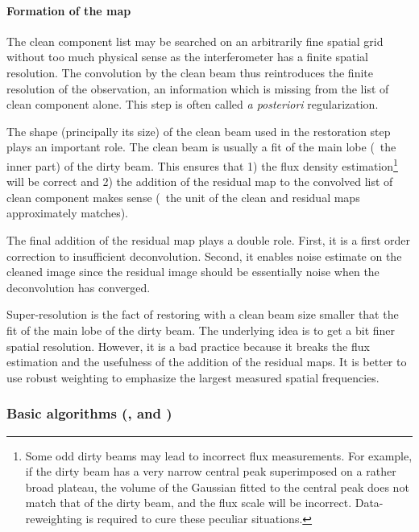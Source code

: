 \paragraph{Formation of the \clean{} map}

The clean component list may be searched on an arbitrarily fine spatial
grid without too much physical sense as the interferometer has a finite
spatial resolution.  The convolution by the clean beam thus reintroduces the
finite resolution of the observation, an information which is missing from the
list of clean component alone. This step is often called \emph{a
  posteriori} regularization.

The shape (principally its size) of the clean beam used in the restoration
step plays an important role. The clean beam is usually a fit of the main
lobe (\ie\ the inner part) of the dirty beam. This ensures that 1) the flux
density 
estimation\footnote{Some odd dirty beams may lead to incorrect flux measurements. For example,
if the dirty beam has a very narrow central peak superimposed on a rather broad
plateau, the volume of the Gaussian fitted to the central peak does
not match that of the dirty beam, and the flux scale will be incorrect.
Data-reweighting is required to cure these peculiar situations.}
  will be correct and 2) the addition of the residual map
to the convolved list of clean component makes sense (\ie\ the unit of the
clean and residual maps approximately matches). 

The final addition of the residual map plays a double role. First, it is a
first order correction to insufficient deconvolution. Second, it enables
noise estimate on the cleaned image since the residual image should be
essentially noise when the deconvolution has converged.

Super-resolution is the fact of restoring
with a clean beam size smaller that the fit of the main lobe of the dirty
beam. The underlying idea is to get a bit finer spatial resolution.
However, it is a bad practice because it breaks the flux estimation and the
usefulness of the addition of the residual maps. It is better to use robust
weighting to emphasize the largest measured spatial frequencies.



\subsubsection{Basic \clean{} algorithms (,  and )}

